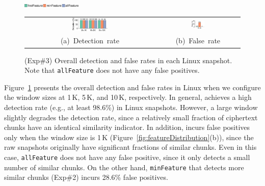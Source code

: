 \begin{figure}[t]
    \centering
    \includegraphics[width=0.25\textwidth]{pic/featurespy/plot/detection/overall/effectiveness-falsePositive_legend.pdf}
    \vspace{5pt}\\
    \begin{tabular}{@{\ }c@{\ }c}
        \includegraphics[width=0.286\textwidth]{pic/featurespy/plot/detection/overall/effectivenessLinux.pdf} &
        \includegraphics[width=0.16\textwidth]{pic/featurespy/plot/detection/overall/falsePositiveLinux.pdf}\\
        \mbox{\small (a) Detection rate} &
        \mbox{\small (b) False rate}\\
    \end{tabular}
    \vspace{-6pt}
    \caption{(Exp\#3) Overall detection and false rates in each Linux snapshot. Note that {\tt allFeature} does not have any false positives.}
    \vspace{-6pt}
    \label{fig:expDetectionOverallFalsePositive}
\end{figure}


Figure~\ref{fig:expDetectionOverallFalsePositive} presents the overall detection and false rates in Linux when we configure the window sizes at 1\,K, 5\,K, and 10\,K, respectively. In general, \sysnameF achieves a high detection rate (e.g., at least 98.6\%) in Linux snapshots. However, a large window slightly degrades the detection rate, since a relatively small fraction of ciphertext chunks have an identical similarity indicator.
In addition, \sysnameF incurs false positives only when the window size is 1\,K (Figure~\ref{fig:featureDistribution}(b)), since the raw snapshots originally have significant fractions of similar chunks. Even in this case, {\tt allFeature} does not have any false positive, since it only detects a small number of similar chunks. On the other hand, {\tt minFeature} that detects more similar chunks (Exp\#2) incurs 28.6\% false positives.

